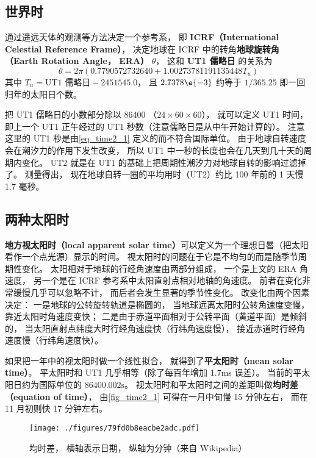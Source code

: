 

\subsection{世界时}
通过遥远天体的观测等方法决定一个参考系， 即 \textbf{ICRF（International Celestial Reference Frame）}， 决定地球在 ICRF 中的转角\textbf{地球旋转角（Earth Rotation Angle， ERA）} $\theta$， 这和 \textbf{UT1 儒略日} 的关系为
\begin{equation}\label{eq_time2_1}
\theta = 2\pi(0.7790572732640 + 1.00273781191135448 T_u)
\end{equation}
其中 $T_u = \text{UT1 儒略日} - 2451545.0$， 且 $2.7378\e{-3}$ 约等于 $1/365.25$ 即一回归年的太阳日个数。

把 UT1 儒略日的小数部分除以 86400 （$24\times 60\times 60$）， 就可以定义 UT1 时间， 即上一个 UT1 正午经过的 UT1 秒数（注意儒略日是从中午开始计算的）。 注意这里的 UT1 秒是由\autoref{eq_time2_1} 定义的而不符合国际单位。 由于地球自转速度会在潮汐力的作用下发生改变， 所以 UT1 中一秒的长度也会在几天到几十天的周期内变化。 UT2 就是在 UT1 的基础上把周期性潮汐力对地球自转的影响过滤掉了。 测量得出， 现在地球自转一圈的平均用时（UT2）约比 100 年前的 1 天慢 1.7 毫秒。

\subsection{两种太阳时}
\textbf{地方视太阳时（local apparent solar time）}可以定义为一个理想日晷（把太阳看作一个点光源）显示的时间。 视太阳时的问题在于它是不均匀的而是随季节周期性变化。 太阳相对于地球的行经角速度由两部分组成， 一个是上文的 ERA 角速度， 另一个是在 ICRF 参考系中太阳直射点相对地轴的角速度。 前者在变化非常缓慢几乎可以忽略不计， 而后者会发生显著的季节性变化。 改变化由两个因素决定： 一是地球的公转旋转轨道是椭圆的， 当地球远离太阳时公转角速度变慢， 靠近太阳时角速度变快； 二是由于赤道平面相对于公转平面（黄道平面）是倾斜的， 当太阳直射点纬度大时行经角速度快（行纬角速度慢）， 接近赤道时行经角速度慢（行纬角速度快）。

如果把一年中的视太阳时做一个线性拟合， 就得到了\textbf{平太阳时（mean solar time）}。 平太阳时和 UT1 几乎相等（除了每百年增加 1.7ms 误差）。 当前的平太阳日约为国际单位的 $86400.002\mathrm{s}$。 视太阳时和平太阳时之间的差距叫做\textbf{均时差（equation of time）}， 由\autoref{fig_time2_1} 可得在一月中旬慢 15 分钟左右， 而在 11 月初则快 17 分钟左右。

\begin{figure}[ht]
\centering
\texttt{[image: ./figures/79fd0b8eacbe2adc.pdf]}
\caption{均时差， 横轴表示日期， 纵轴为分钟（来自 Wikipedia）} \label{fig_time2_1}
\end{figure}

